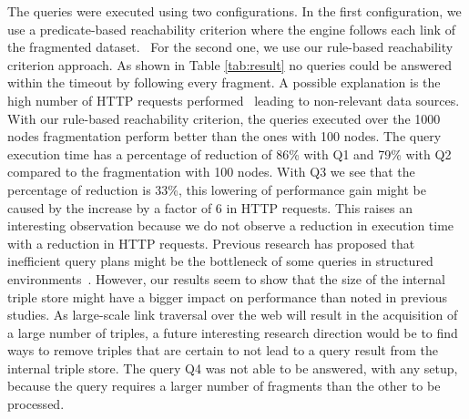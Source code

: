 The queries were executed using two configurations.
In the first configuration, we use a predicate-based reachability criterion where the engine follows each link of the fragmented dataset.~
For the second one, we use our rule-based reachability criterion approach.
As shown in Table \ref{tab:result} no queries could be answered within the timeout by following every fragment.
A possible explanation is the high number of HTTP requests performed~\cite{Hartig2016} leading to non-relevant data sources. 
With our rule-based reachability criterion, the queries executed over the 1000 nodes fragmentation perform better than the ones with 100 nodes.
The query execution time has a percentage of reduction of 86\% with Q1 and 79\% with Q2 compared to the fragmentation with 100 nodes.
With Q3 we see that the percentage of reduction is 33\%, this lowering of performance gain might be caused by the increase by a factor of 6 in HTTP requests.
This raises an interesting observation because we do not observe a reduction in execution time with a reduction in HTTP requests.
Previous research has proposed that inefficient query plans might be the bottleneck of some queries in structured environments~\cite{taelman2023,eschauzier_quweda_2023}.
However, our results seem to show that the size of the internal triple store might have a bigger impact on performance than noted in previous studies.
As large-scale link traversal over the web will result in the acquisition of a large number of triples, a future interesting research direction would be to find ways to remove triples that are certain to not lead to a query result from the internal triple store.
The query Q4 was not able to be answered, with any setup, because the query requires a larger number of fragments than the other to be processed.
